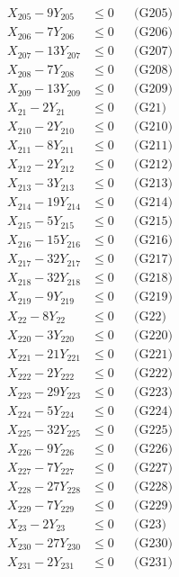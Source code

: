 \documentclass[a4paper,10pt]{article}
\begin{document}
{\begin{align}
X_{205} - 9Y_{205} &\leq 0 && \text{(G205)} \\
\allowbreak
X_{206} - 7Y_{206} &\leq 0 && \text{(G206)} \\
X_{207} - 13Y_{207} &\leq 0 && \text{(G207)} \\
X_{208} - 7Y_{208} &\leq 0 && \text{(G208)} \\
X_{209} - 13Y_{209} &\leq 0 && \text{(G209)} \\
X_{21} - 2Y_{21} &\leq 0 && \text{(G21)} \\
X_{210} - 2Y_{210} &\leq 0 && \text{(G210)} \\
X_{211} - 8Y_{211} &\leq 0 && \text{(G211)} \\
X_{212} - 2Y_{212} &\leq 0 && \text{(G212)} \\
X_{213} - 3Y_{213} &\leq 0 && \text{(G213)} \\
X_{214} - 19Y_{214} &\leq 0 && \text{(G214)} \\
X_{215} - 5Y_{215} &\leq 0 && \text{(G215)} \\
X_{216} - 15Y_{216} &\leq 0 && \text{(G216)} \\
X_{217} - 32Y_{217} &\leq 0 && \text{(G217)} \\
X_{218} - 32Y_{218} &\leq 0 && \text{(G218)} \\
X_{219} - 9Y_{219} &\leq 0 && \text{(G219)} \\
X_{22} - 8Y_{22} &\leq 0 && \text{(G22)} \\
X_{220} - 3Y_{220} &\leq 0 && \text{(G220)} \\
X_{221} - 21Y_{221} &\leq 0 && \text{(G221)} \\
X_{222} - 2Y_{222} &\leq 0 && \text{(G222)} \\
X_{223} - 29Y_{223} &\leq 0 && \text{(G223)} \\
\allowbreak
X_{224} - 5Y_{224} &\leq 0 && \text{(G224)} \\
X_{225} - 32Y_{225} &\leq 0 && \text{(G225)} \\
X_{226} - 9Y_{226} &\leq 0 && \text{(G226)} \\
X_{227} - 7Y_{227} &\leq 0 && \text{(G227)} \\
X_{228} - 27Y_{228} &\leq 0 && \text{(G228)} \\
X_{229} - 7Y_{229} &\leq 0 && \text{(G229)} \\
X_{23} - 2Y_{23} &\leq 0 && \text{(G23)} \\
X_{230} - 27Y_{230} &\leq 0 && \text{(G230)} \\
X_{231} - 2Y_{231} &\leq 0 && \text{(G231)} \\

\end{align}}
\end{document}
